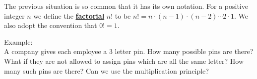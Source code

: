 \documentclass[14,fleqn]{article}
\newcommand{\defn}[1]{\textbf{\underline{#1}}}
\begin{document}
The previous situation is so common that it has its own notation. For a positive integer $n$ we define the \defn{factorial} $n!$ to be $n!=n\cdot (n-1)\cdot (n-2)\cdots 2\cdot 1.$ We also adopt the convention that $0!=1.$

Example:\\
A company gives each employee a 3 letter pin. How many possible pins are there? What if they are not allowed to assign pins which are all the same letter? How many such pins are there? Can we use the multiplication principle?
\end{document}
